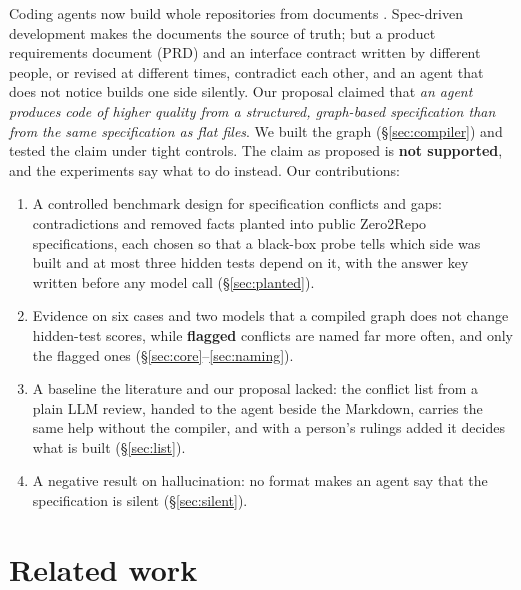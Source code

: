 \documentclass{article}
\begin{document}
Coding agents now build whole repositories from documents
\citep{chen2026repo0,peng2026repogenesis,yang2026zero2repo}. Spec-driven development makes the documents the source of truth;
but a product requirements document (PRD) and an interface contract written by different people, or
revised at different times, contradict each other, and an agent that does not notice builds one side
silently. Our proposal claimed that \emph{an agent produces code of higher quality from a structured,
graph-based specification than from the same specification as flat files}. We built the graph
(\S\ref{sec:compiler}) and tested the claim under tight controls. The claim as proposed is \textbf{not
supported}, and the experiments say what to do instead. Our contributions:
\begin{enumerate}
  \item A controlled benchmark design for specification conflicts and gaps: contradictions and removed
  facts planted into public Zero2Repo specifications, each chosen so that a black-box probe tells which
  side was built and at most three hidden tests depend on it, with the answer key written before any
  model call (\S\ref{sec:planted}).
  \item Evidence on six cases and two models that a compiled graph does not change hidden-test scores,
  while \textbf{flagged} conflicts are named far more often, and only the flagged ones
  (\S\ref{sec:core}--\ref{sec:naming}).
  \item A baseline the literature and our proposal lacked: the conflict list from a plain LLM review,
  handed to the agent beside the Markdown, carries the same help without the compiler, and with a
  person's rulings added it decides what is built (\S\ref{sec:list}).
  \item A negative result on hallucination: no format makes an agent say that the specification is silent
  (\S\ref{sec:silent}).
\end{enumerate}

\section{Related work}
\end{document}
